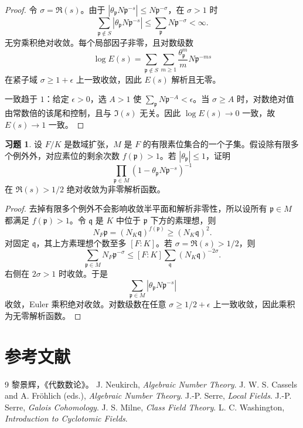 \documentclass[11pt,a4paper,openany]{ctexbook}
\numberwithin{equation}{chapter}
\theoremstyle{plain}
\theoremstyle{definition}
\newtheorem{exercise}[theorem]{习题}
\theoremstyle{remark}
\begin{document}
\begin{proof}
令 $\sigma=\Re(s)$。由于 $|\theta_{\mathfrak p}N\mathfrak p^{-s}|\le N\mathfrak p^{-\sigma}$，在 $\sigma>1$ 时
\[
  \sum_{\mathfrak p\notin S}|\theta_{\mathfrak p}N\mathfrak p^{-s}|
  \le
  \sum_{\mathfrak p}N\mathfrak p^{-\sigma}<\infty .
\]
无穷乘积绝对收敛。每个局部因子非零，且对数级数
\[
  \log E(s)=\sum_{\mathfrak p\notin S}\sum_{m\ge1}
  \frac{\theta_{\mathfrak p}^m}{m}N\mathfrak p^{-ms}
\]
在紧子域 $\sigma\ge1+\epsilon$ 上一致收敛，因此 $E(s)$ 解析且无零。

一致趋于 $1$：给定 $\epsilon>0$，选 $A>1$ 使 $\sum_{\mathfrak p}N\mathfrak p^{-A}<\epsilon$。当 $\sigma\ge A$ 时，对数绝对值由常数倍的该尾和控制，且与 $\Im(s)$ 无关。因此 $\log E(s)\to0$ 一致，故 $E(s)\to1$ 一致。
\end{proof}

\begin{exercise}
设 $F/K$ 是数域扩张，$M$ 是 $F$ 的有限素位集合的一个子集。假设除有限多个例外外，对应素位的剩余次数 $f(\mathfrak p)>1$。若 $|\theta_{\mathfrak p}|\le1$，证明
\[
  \prod_{\mathfrak p\in M}(1-\theta_{\mathfrak p}N\mathfrak p^{-s})^{-1}
\]
在 $\Re(s)>1/2$ 绝对收敛为非零解析函数。
\end{exercise}

\begin{proof}
去掉有限多个例外不会影响收敛半平面和解析非零性，所以设所有 $\mathfrak p\in M$ 都满足 $f(\mathfrak p)>1$。令 $\mathfrak q$ 是 $K$ 中位于 $\mathfrak p$ 下方的素理想，则
\[
  N_F\mathfrak p=(N_K\mathfrak q)^{f(\mathfrak p)}\ge (N_K\mathfrak q)^2.
\]
对固定 $\mathfrak q$，其上方素理想个数至多 $[F:K]$。若 $\sigma=\Re(s)>1/2$，则
\[
  \sum_{\mathfrak p\in M}N_F\mathfrak p^{-\sigma}
  \le
  [F:K]\sum_{\mathfrak q}(N_K\mathfrak q)^{-2\sigma}.
\]
右侧在 $2\sigma>1$ 时收敛。于是
\[
  \sum_{\mathfrak p\in M}|\theta_{\mathfrak p}N\mathfrak p^{-s}|
\]
收敛，Euler 乘积绝对收敛。对数级数在任意 $\sigma\ge1/2+\epsilon$ 上一致收敛，因此乘积为无零解析函数。
\end{proof}
 
\backmatter
\chapter*{参考文献}
\begin{thebibliography}{9}
 黎景辉，《代数数论》。
 J. Neukirch, \emph{Algebraic Number Theory}.
 J. W. S. Cassels and A. Fröhlich (eds.), \emph{Algebraic Number Theory}.
 J.-P. Serre, \emph{Local Fields}.
 J.-P. Serre, \emph{Galois Cohomology}.
 J. S. Milne, \emph{Class Field Theory}.
 L. C. Washington, \emph{Introduction to Cyclotomic Fields}.
\end{thebibliography}
\end{document}
